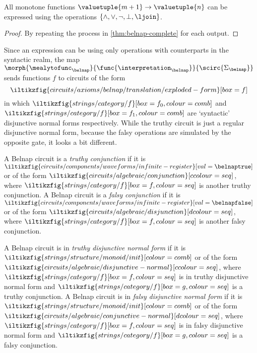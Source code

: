 \begin{corollary}
    All monotone functions \(\valuetuple{m+1} \to \valuetuple{n}\) can be
    expressed using the operations \(\{\land,\lor,\neg,\bot,\ljoin\}\).
\end{corollary}
\begin{proof}
    By repeating the process in \cref{thm:belnap-complete} for each output.
\end{proof}

Since an expression can be  using only operations with counterparts in
the syntactic realm, the map \(
\morph{\mealytofunc_\belnap}{\func{\interpretation_\belnap}}{\scirc{\Sigma_\belnap}}
\) sends functions \(f\) to circuits of the form \[
    \iltikzfig{circuits/axioms/belnap/translation/exploded-form}[box=f]
\] in which \(
\iltikzfig{strings/category/f}[box=f_0,colour=comb]
\) and \(
\iltikzfig{strings/category/f}[box=f_1,colour=comb]
\) are `syntactic' disjunctive normal forms respectively.
While the truthy circuit is just a regular disjunctive normal form, because
the falsy operations are simulated by the opposite gate, it looks a bit
different.

\begin{definition}[Conjunction]
    A Belnap circuit is a \emph{truthy conjunction} if it is \(
    \iltikzfig{circuits/components/waveforms/infinite-register}[val=\belnaptrue]
    \) or of the form \(
    \iltikzfig{circuits/algebraic/conjunction}[ccolour=seq]
    \), where \(
    \iltikzfig{strings/category/f}[box=f, colour=seq]
    \) is another truthy conjunction.
    A Belnap circuit is a \emph{falsy conjunction} if it is \(
    \iltikzfig{circuits/components/waveforms/infinite-register}[val=\belnapfalse]
    \) or of the form \(
    \iltikzfig{circuits/algebraic/disjunction}[dcolour=seq]
    \), where \(
    \iltikzfig{strings/category/f}[box=f, colour=seq]
    \) is another falsy conjunction.
\end{definition}

\begin{definition}
    A Belnap circuit is in \emph{truthy disjunctive normal form} if it is \(
    \iltikzfig{strings/structure/monoid/init}[colour=comb]
    \) or of the form \(
    \iltikzfig{circuits/algebraic/disjunctive-normal}[ccolour=seq]
    \), where \(
    \iltikzfig{strings/category/f}[box=f, colour=seq]
    \) is in truthy disjunctive normal form and \(
    \iltikzfig{strings/category/f}[box=g, colour=seq]
    \) is a truthy conjunction.
    A Belnap circuit is in \emph{falsy disjunctive normal form} if it is \(
    \iltikzfig{strings/structure/monoid/init}[colour=comb]
    \) or of the form \(
    \iltikzfig{circuits/algebraic/conjunctive-normal}[dcolour=seq]
    \), where \(
    \iltikzfig{strings/category/f}[box=f, colour=seq]
    \) is in falsy disjunctive normal form and \(
    \iltikzfig{strings/category/f}[box=g, colour=seq]
    \) is a falsy conjunction.
\end{definition}

